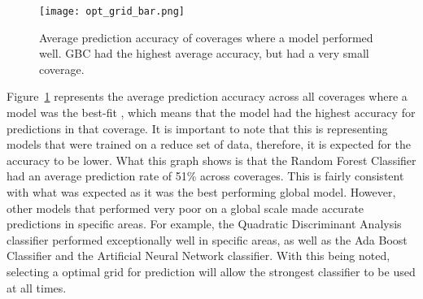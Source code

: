 \begin{figure}[htp]
    \centering
    \texttt{[image: opt\_grid\_bar.png]}
    \caption[Graph depicting average balanced accuracy of each model in cache]{Average prediction accuracy of coverages where a model performed well. 
    GBC had the highest average accuracy, but had a very small coverage.}
    \label{fig:grid_opt_graph}
\end{figure}

\par
Figure~\ref{fig:grid_opt_graph} represents the average prediction accuracy across all coverages where a model was the best-fit
, which means that the model had the highest accuracy for predictions in that coverage.
It is important to note that this is representing models that were trained on a reduce set of data, therefore, it is expected for the accuracy to be lower.
What this graph shows is that the Random Forest Classifier had an average prediction rate of 51\% across coverages.
This is fairly consistent with what was expected as it was the best performing global model. 
However, other models that performed very poor on a global scale made accurate predictions in specific areas.
For example, the Quadratic Discriminant Analysis classifier performed exceptionally well in specific areas, as well as the Ada Boost Classifier and the Artificial Neural Network classifier.
With this being noted, selecting a optimal grid for prediction will allow the strongest classifier to be used at all times.


